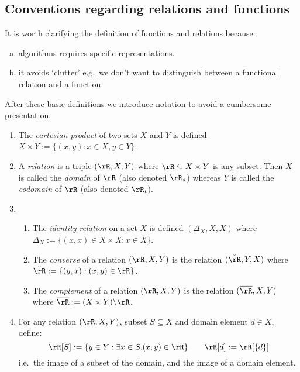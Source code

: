 \documentclass{article}
\begin{document}
\subsection{Conventions regarding relations and functions}

It is worth clarifying the definition of functions and relations because:
\begin{enumerate}[(a)]
\item
algorithms requires specific representations.
\item
it avoids `clutter' e.g.\ we don't want to distinguish between a functional relation and a function.
\end{enumerate}

After these basic definitions we introduce notation to avoid a cumbersome presentation.

\begin{definition}
\label{def:rel_and_func}
\item
\begin{enumerate}
\item
The \emph{cartesian product} of two sets $X$ and $Y$ is defined $X \times Y := \{ (x,y) : x \in X, y \in Y\}$.

\item
A \emph{relation} is a triple $(\rR,X,Y)$ where $\rR \subseteq X \times Y$ is any subset. Then $X$ is called the \emph{domain} of $\rR$ (also denoted $\rR_s$) whereas $Y$ is called the \emph{codomain} of $\rR$ (also denoted $\rR_t$).

\item
\begin{enumerate}
\item
The \emph{identity relation} on a set $X$ is defined $(\Delta_X,X,X)$ where $\Delta_X := \{(x,x) \in X \times X : x \in X\}$.

\item
The \emph{converse} of a relation $(\rR,X,Y)$ is the relation $(\breve{\rR},Y,X)$ where $\breve{\rR} := \{ (y,x) : (x,y) \in \rR \}$.

\item
The \emph{complement} of a relation $(\rR,X,Y)$ is the relation $(\overline{\rR},X,Y)$ where $\overline{\rR} := (X \times Y) \backslash \rR$.
\end{enumerate}

\item
For any relation $(\rR, X, Y)$, subset $S \subseteq X$ and domain element $d \in X$, define:
\[
\rR[S] := \{ y \in Y : \exists x \in S. (x,y) \in \rR \}
\qquad
\rR[d] := \rR[\{d\}]
\]
i.e.\ the image of a subset of the domain, and the image of a domain element.


\end{enumerate}
\end{definition}
\end{document}
